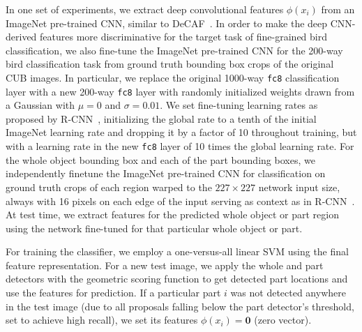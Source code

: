 In one set of experiments, we extract deep convolutional features $\phi(x_i)$ from an ImageNet pre-trained CNN, similar to DeCAF~\cite{decaf}.
In order to make the deep CNN-derived features more discriminative for the target task of fine-grained bird classification, we also fine-tune the ImageNet pre-trained CNN for the 200-way bird classification task from ground truth bounding box crops of the original CUB images.
In particular, we replace the original 1000-way \texttt{fc8} classification layer with a new 200-way \texttt{fc8} layer with randomly initialized weights drawn from a Gaussian with $\mu = 0$ and $\sigma = 0.01$.
We set fine-tuning learning rates as proposed by R-CNN~\cite{rcnn}, initializing the global rate to a tenth of the initial ImageNet learning rate and dropping it by a factor of 10 throughout training, but with a learning rate in the new \texttt{fc8} layer of 10 times the global learning rate.
For the whole object bounding box and each of the part bounding boxes, we independently finetune the ImageNet pre-trained CNN for classification on ground truth crops of each region warped to the $227 \times 227$ network input size, always with 16 pixels on each edge of the input serving as context as in R-CNN~\cite{rcnn}.
At test time, we extract features for the predicted whole object or part region using the network fine-tuned for that particular whole object or part.

For training the classifier, we employ a one-versus-all linear SVM using the final feature representation. For a new test image, we apply the whole and part detectors with the geometric scoring function to get detected part locations and use the features for prediction.
If a particular part $i$ was not detected anywhere in the test image (due to all proposals falling below the part detector's threshold, set to achieve high recall), we set its features $\phi(x_i) = \mathbf{0}$ (zero vector).
